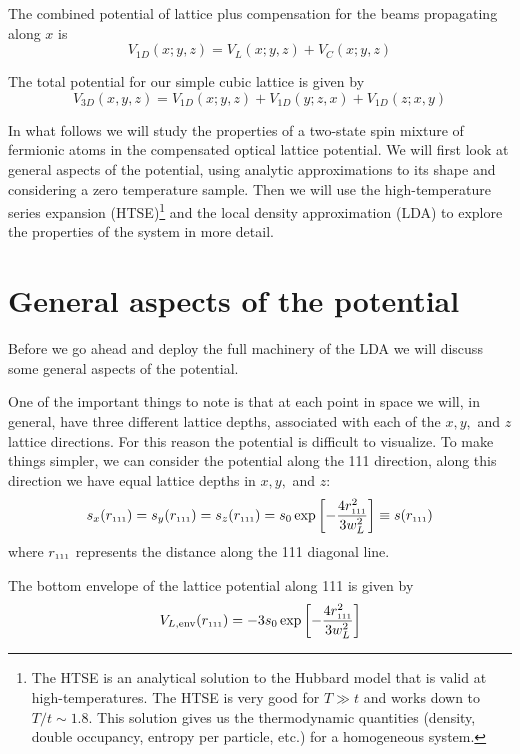 \documentclass[11pt,letter]{article}
\newcommand{\rdiag}{\ensuremath{ r_{\text{\tiny{111}}} } }
\begin{document}
The combined potential of lattice plus compensation for the beams propagating
along $x$ is 
\begin{equation}
  V_{1D}( x; y ,z ) = V_{L}(x; y,z) + V_{C}(x; y, z)
\end{equation}

The total potential for our simple cubic lattice is given by 
\begin{equation}
  V_{3D}(x, y, z)  =  V_{1D}( x; y,z) + V_{1D}( y; z,x) + V_{1D}(z; x,y)
\end{equation}


In what follows we will study the properties of a two-state spin mixture of
fermionic atoms in the compensated optical lattice potential.  We will first
look at general aspects of the potential, using analytic approximations to its
shape and considering a zero temperature sample.  Then we will use the
high-temperature series expansion (HTSE)\footnote{ The HTSE is  an analytical
solution to the Hubbard model that is valid at high-temperatures.  The HTSE is
very good for $T \gg t$ and works down to $T/t \sim 1.8$.  This solution gives
us the thermodynamic quantities (density, double occupancy, entropy per
particle, etc.)  for a homogeneous system.}  and the local density
approximation (LDA) to explore the properties of the system in more detail. 

\section{General aspects of the potential }

Before we go ahead and deploy the full machinery of the LDA we will discuss
some general aspects of the potential. 

One of the important things to note is that at each point in space  we will, in
general, have three different lattice depths, associated with each of the
$x,y,$ and $z$ lattice directions.  For this reason the potential is difficult
to visualize.  To make things simpler, we can consider the potential along the
111 direction,    along this direction we have equal
lattice depths in $x,y,$ and $z$:
\begin{equation} 
  s_{x}( \rdiag ) = s_{y}( \rdiag ) = s_{z}( \rdiag ) = 
  s_{0} \exp \left[ - \frac{ 4 \rdiag^{2} }{3 w_{L}^{2} } \right]  
  \equiv s(\rdiag) 
\end{equation}
where $\rdiag$ represents the distance along the 111 diagonal line.

The bottom envelope of the lattice potential along 111 is given by 
\begin{equation}
  V_{L,\text{env}}( \rdiag )  = -3 s_{0} 
  \exp \left[ - \frac{ 4 \rdiag^{2} }{3 w_{L}^{2} } \right]  
\end{equation} 
\end{document}
